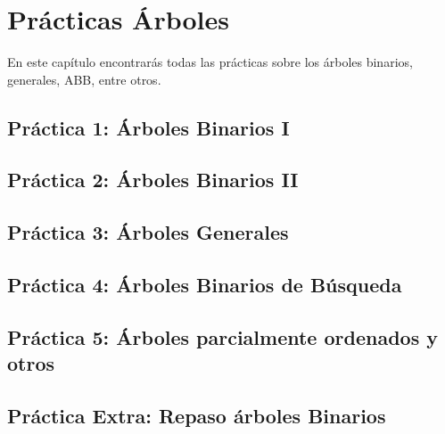 \chapter{Prácticas Árboles}
En este capítulo encontrarás todas las prácticas sobre los árboles binarios, generales, ABB, entre otros.

\section*{Práctica 1: Árboles Binarios I}
{}
\label{sec:practica1}



\section*{Práctica 2: Árboles Binarios II}
{}
\label{sec:practica2}


\section*{Práctica 3: Árboles Generales}
{}
\label{sec:practica3}


\section*{Práctica 4: Árboles Binarios de Búsqueda}
{}
\label{sec:practica4}


\newpage
\section*{Práctica 5: Árboles parcialmente ordenados y otros}
{}
\label{sec:practica5}


\section*{Práctica Extra: Repaso árboles Binarios}
{}
\label{sec:practicaextra}

